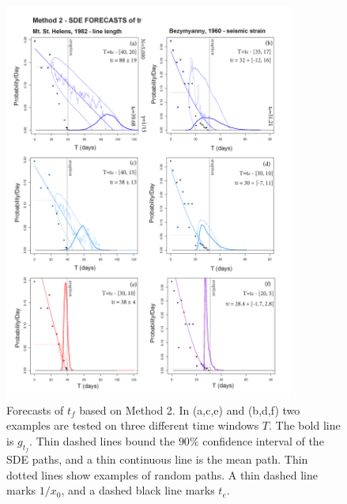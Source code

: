 \documentclass{article}
\begin{document}
\begin{figure}[H]\vskip-0.5cm
\centering
\includegraphics[width=0.85\textwidth]{Fig8_9new.png}
\caption{Forecasts of $t_f$ based on Method 2. In (a,c,e) and (b,d,f) two examples are tested on three different time windows $T$. The bold line is $g_{t_f}$. Thin dashed lines bound the $90\%$ confidence interval of the SDE paths, and a thin continuous line is the mean path. Thin dotted lines show examples of random paths. A thin dashed line marks $1/x_0$, and a dashed black line marks $t_e$.}
\label{Fig8_10}
\end{figure}
\end{document}

